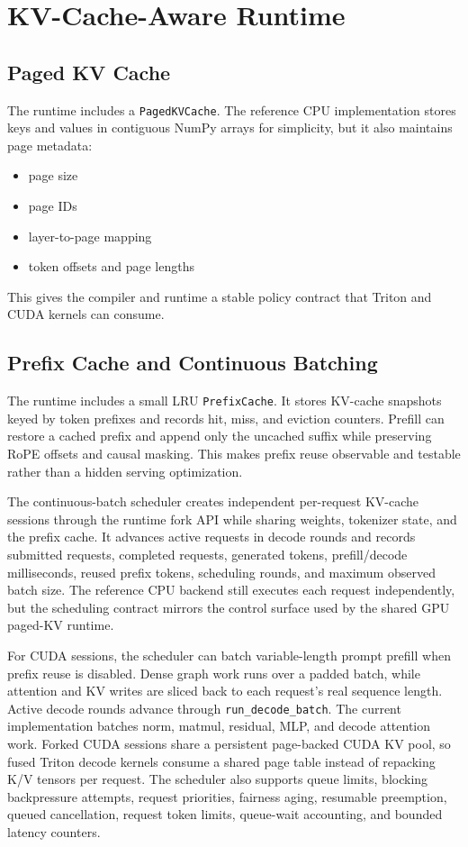\documentclass[11pt]{article}
\begin{document}
\section{KV-Cache-Aware Runtime}

\subsection{Paged KV Cache}

The runtime includes a \texttt{PagedKVCache}. The reference CPU implementation
stores keys and values in contiguous NumPy arrays for simplicity, but it also
maintains page metadata:

\begin{itemize}[leftmargin=*]
  \item page size
  \item page IDs
  \item layer-to-page mapping
  \item token offsets and page lengths
\end{itemize}

This gives the compiler and runtime a stable policy contract that Triton and CUDA
kernels can consume.

\subsection{Prefix Cache and Continuous Batching}

The runtime includes a small LRU \texttt{PrefixCache}. It stores KV-cache
snapshots keyed by token prefixes and records hit, miss, and eviction counters.
Prefill can restore a cached prefix and append only the uncached suffix while
preserving RoPE offsets and causal masking. This makes prefix reuse observable
and testable rather than a hidden serving optimization.

The continuous-batch scheduler creates independent per-request KV-cache sessions
through the runtime fork API while sharing weights, tokenizer state, and the
prefix cache. It advances active requests in decode rounds and records submitted
requests, completed requests, generated tokens, prefill/decode milliseconds,
reused prefix tokens, scheduling rounds, and maximum observed batch size. The
reference CPU backend still executes each request independently, but the
scheduling contract mirrors the control surface used by the shared GPU paged-KV
runtime.

For CUDA sessions, the scheduler can batch variable-length prompt prefill when
prefix reuse is disabled. Dense graph work runs over a padded batch, while
attention and KV writes are sliced back to each request's real sequence length.
Active decode rounds advance through \texttt{run\_decode\_batch}. The current
implementation batches norm, matmul, residual, MLP, and decode attention work.
Forked CUDA sessions share a persistent page-backed CUDA KV pool, so fused
Triton decode kernels consume a shared page table instead of repacking K/V
tensors per request. The scheduler also supports queue limits, blocking
backpressure attempts, request priorities, fairness aging, resumable preemption,
queued cancellation, request token limits, queue-wait accounting, and bounded
latency counters.
\end{document}
